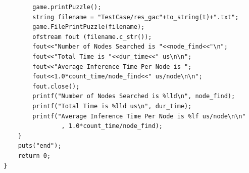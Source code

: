 \documentclass{article}
\begin{document}
\begin{lstlisting}
        game.printPuzzle();
        string filename = "TestCase/res_gac"+to_string(t)+".txt";
        game.FilePrintPuzzle(filename);
        ofstream fout (filename.c_str());
        fout<<"Number of Nodes Searched is "<<node_find<<"\n";
        fout<<"Total Time is "<<dur_time<<" us\n\n";
        fout<<"Average Inference Time Per Node is ";
        fout<<1.0*count_time/node_find<<" us/node\n\n";
        fout.close();
        printf("Number of Nodes Searched is %lld\n", node_find);
        printf("Total Time is %lld us\n", dur_time);
        printf("Average Inference Time Per Node is %lf us/node\n\n"
                , 1.0*count_time/node_find);
    }
    puts("end");
    return 0;
}
\end{lstlisting}


%
%
\end{document}
